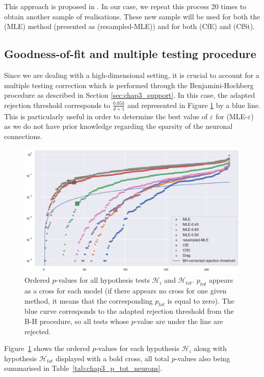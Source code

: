 This approach is proposed in \cite[Section 3.4]{Reynaud2014}. In our case, we repeat this process 20 times to obtain another sample of realisations. These new sample will be used for both the (MLE) method (presented as (resampled-MLE)) and for both (CfE) and (CfSt).


\subsection{Goodness-of-fit and multiple testing procedure}

Since we are dealing with a high-dimensional setting, it is crucial to account for a multiple testing correction which is performed through the Benjamini-Hochberg procedure as described in Section \ref{sec:chap3_support}. In this case, the adapted rejection threshold corresponds to $\frac{0.05 k}{d+1}$ and represented in Figure \ref{fig:chap3_p_values_neurons} by a blue line.
This is particularly useful in order to determine the best value of $\varepsilon$ for (MLE-$\varepsilon$) as we do not have prior knowledge regarding the sparsity of the neuronal connections.

{\begin{figure}[!ht]
\centering
\includegraphics[width=0.9\linewidth]{images/chapter3/p_values_conf.pdf}
\caption{Ordered $p$-values for all hypothesis tests $\mathcal{H}_i$ and $\mathcal{H}_{tot}$. $p_{tot}$ appears as a cross for each model (if there appears no cross for one given method, it means that the corresponding $p_{tot}$ is equal to zero). The blue curve corresponds to the adapted rejection threshold from the B-H procedure, so all tests whose $p$-value are under the line are rejected.}
\label{fig:chap3_p_values_neurons}
\end{figure}}

 Figure~\ref{fig:chap3_p_values_neurons} shows the ordered $p$-values for each hypothesis $\mathcal{H}_i$ along with hypothesis $\mathcal{H}_{tot}$ displayed with a bold cross, all total $p$-values also being summarised in Table~\ref{tab:chap3_p_tot_neurons}. 
    
